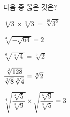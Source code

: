 다음 중 옳은 것은?
\begin{choicesii}{\rule[-3ex]{0pt}{8ex}$\sqrt[4]{3}\times\sqrt[5]{3}=\sqrt[20]{3^8}$}{\rule[-3ex]{0pt}{8ex}$\sqrt[3]{-\sqrt{64}}=2$}{\rule[-3ex]{0pt}{8ex}$\sqrt[6]{\sqrt[3]{4}}=\sqrt[9]{2}$}{\rule[-3ex]{0pt}{8ex}$\dfrac{\sqrt[3]{128}}{\sqrt[3]{8}\mkern3mu \sqrt[3]{4}}=\sqrt[3]{2}$}{\rule[-3ex]{0pt}{8ex}$\sqrt[4]{\dfrac{\sqrt[4]{5}}{\sqrt[3]{9}}}\times\sqrt{\dfrac{\sqrt[6]{9}}{\sqrt[8]{5}}}=3$}\end{choicesii}
